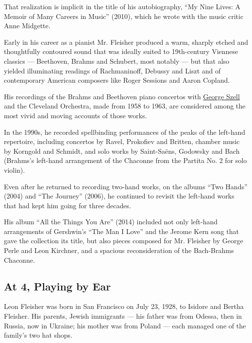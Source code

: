 That realization is implicit in the title of his autobiography, ``My
Nine Lives: A Memoir of Many Careers in Music'' (2010), which he wrote
with the music critic Anne Midgette.

Early in his career as a pianist Mr. Fleisher produced a warm, sharply
etched and thoughtfully contoured sound that was ideally suited to
19th-century Viennese classics --- Beethoven, Brahms and Schubert, most
notably --- but that also yielded illuminating readings of Rachmaninoff,
Debussy and Liszt and of contemporary American composers like Roger
Sessions and Aaron Copland.

His recordings of the Brahms and Beethoven piano concertos with
\href{https://www.nytimes3xbfgragh.onion/1970/07/31/archives/george-szell-conductor-is-dead-george-szell-of-cleveland-orchestra.html\#:~:text=George\%20Szell\%2C\%20conductor\%20of\%20the,He\%20was\%2073\%20years\%20old.}{George
Szell} and the Cleveland Orchestra, made from 1958 to 1963, are
considered among the most vivid and moving accounts of those works.

In the 1990s, he recorded spellbinding performances of the peaks of the
left-hand repertoire, including concertos by Ravel, Prokofiev and
Britten, chamber music by Korngold and Schmidt, and solo works by
Saint-Saëns, Godowsky and Bach (Brahms's left-hand arrangement of the
Chaconne from the Partita No. 2 for solo violin).

Even after he returned to recording two-hand works, on the albums ``Two
Hands'' (2004) and ``The Journey'' (2006), he continued to revisit the
left-hand works that had kept him going for three decades.

His album ``All the Things You Are'' (2014) included not only left-hand
arrangements of Gershwin's ``The Man I Love'' and the Jerome Kern song
that gave the collection its title, but also pieces composed for Mr.
Fleisher by George Perle and Leon Kirchner, and a spacious
reconsideration of the Bach-Brahms Chaconne.

\hypertarget{at-4-playing-by-ear}{%
\subsection{At 4, Playing by Ear}\label{at-4-playing-by-ear}}

Leon Fleisher was born in San Francisco on July 23, 1928, to Isidore and
Bertha Fleisher. His parents, Jewish immigrants --- his father was from
Odessa, then in Russia, now in Ukraine; his mother was from Poland ---
each managed one of the family's two hat shops.

